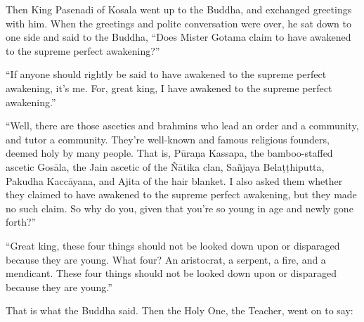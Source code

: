 \documentclass[12pt,openany]{book}%
\begin{document}
Then King Pasenadi of Kosala went up to the Buddha, and exchanged greetings with him. When the greetings and polite conversation were over, he sat down to one side and said to the Buddha, “Does Mister Gotama claim to have awakened to the supreme perfect awakening?” 

“If anyone should rightly be said to have awakened to the supreme perfect awakening, it’s me. For, great king, I have awakened to the supreme perfect awakening.” 

“Well, there are those ascetics and brahmins who lead an order and a community, and tutor a community. They’re well-known and famous religious founders, deemed holy by many people. That is, \textsanskrit{Pūraṇa} Kassapa, the bamboo-staffed ascetic \textsanskrit{Gosāla}, the Jain ascetic of the \textsanskrit{Ñātika} clan, \textsanskrit{Sañjaya} \textsanskrit{Belaṭṭhiputta}, Pakudha \textsanskrit{Kaccāyana}, and Ajita of the hair blanket. I also asked them whether they claimed to have awakened to the supreme perfect awakening, but they made no such claim. So why do you, given that you’re so young in age and newly gone forth?” 

“Great king, these four things should not be looked down upon or disparaged because they are young. What four? An aristocrat, a serpent, a fire, and a mendicant. These four things should not be looked down upon or disparaged because they are young.” 

That is what the Buddha said. Then the Holy One, the Teacher, went on to say: 
\end{document}

